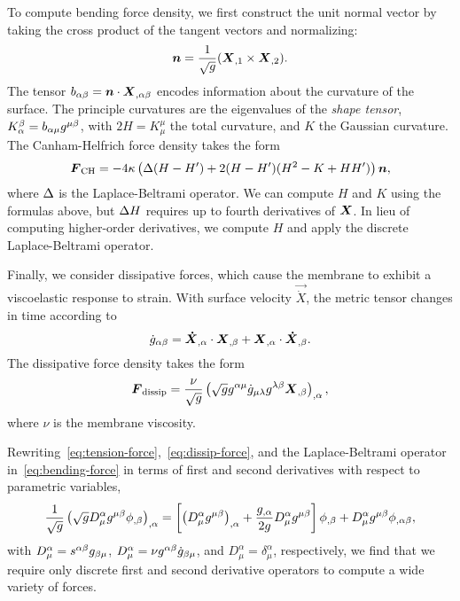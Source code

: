 To compute bending force density, we first construct the unit normal vector by taking the
cross product of the tangent vectors and normalizing:
\begin{equation}\label{eq:unit-normal}
    \boldsymbol{n} = \frac{1}{\sqrt{g}} (\boldsymbol{X}_{,1}\times\boldsymbol{X}_{,2}).
\end{equation}
The tensor $b_{\alpha\beta} = \boldsymbol{n}\cdot\boldsymbol{X}_{,\alpha\beta}$ encodes information about the
curvature of the surface. The principle curvatures are the eigenvalues of the
\emph{shape tensor}, $K_\alpha^\beta = b_{\alpha\mu}g^{\mu\beta}$, with
$2H = K_\mu^\mu$ the total curvature, and $K$ the Gaussian curvature. The Canham-Helfrich
force density takes the form~\cite{Zhongcan:1989ue}%
\begin{equation}\label{eq:bending-force}
    \boldsymbol{F}_\text{CH} = -4\kappa\left(\Delta(H-H')+2(H-H')(H^2-K+HH')\right)\boldsymbol{n},
\end{equation}
where $\Delta$ is the Laplace-Beltrami operator. We can compute $H$ and $K$ using the
formulas above, but $\Delta H$ requires up to fourth derivatives of $\boldsymbol{X}$. In lieu of
computing higher-order derivatives, we compute $H$ and apply the discrete
Laplace-Beltrami operator.

Finally, we consider dissipative forces, which cause the membrane to exhibit a
viscoelastic response to strain. With surface velocity $\vec{\dot{X}}$, the metric tensor
changes in time according to 
\begin{equation}
    \dot{g}_{\alpha\beta} = \boldsymbol{\dot{X}}_{,\alpha}\cdot\boldsymbol{X}_{,\beta} + \boldsymbol{X}_{,\alpha}\cdot\boldsymbol{\dot{X}}_{,\beta}.
\end{equation}
The dissipative force density takes the form~\cite{Rangamani:2012hi}
\begin{equation}\label{eq:dissip-force}
    \boldsymbol{F}_\text{dissip} = \frac{\nu}{\sqrt{g}}\left(\sqrt{g}g^{\alpha\mu}\dot{g}_{\mu\lambda}g^{\lambda\beta}\boldsymbol{X}_{,\beta}\right)_{,\alpha},
\end{equation}
where $\nu$ is the membrane viscosity.

Rewriting~\eqref{eq:tension-force},~\eqref{eq:dissip-force}, and the Laplace-Beltrami
operator in~\eqref{eq:bending-force} in terms of first and second derivatives with
respect to parametric variables,
\begin{equation}\label{eq:expanded-op}
    \frac1{\sqrt{g}}\left(\sqrt{g}D^\alpha_\mu g^{\mu\beta}\phi_{,\beta}\right)_{,\alpha}
    = \left[\left(D^\alpha_\mu g^{\mu\beta}\right)_{,\alpha} + \frac{g_{,\alpha}}{2g}D^\alpha_\mu g^{\mu\beta}\right]\phi_{,\beta}+D^\alpha_\mu g^{\mu\beta}\phi_{,\alpha\beta},
\end{equation}
with $D^\alpha_\mu = s^{\alpha\beta}g_{\beta\mu}$,
$D^\alpha_\mu = \nu g^{\alpha\beta}\dot{g}_{\beta\mu}$, and
$D^\alpha_\mu = \delta^\alpha_\mu$,
respectively, we find that we require only discrete first and second derivative operators
to compute a wide variety of forces.

